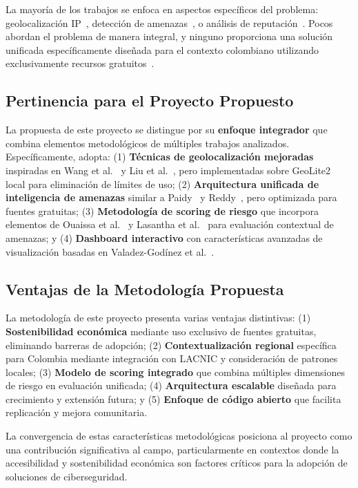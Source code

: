 La mayoría de los trabajos se enfoca en aspectos específicos del problema: geolocalización IP~\cite{6,7,8}, detección de amenazas~\cite{9,12}, o análisis de reputación~\cite{11}. Pocos abordan el problema de manera integral, y ninguno proporciona una solución unificada específicamente diseñada para el contexto colombiano utilizando exclusivamente recursos gratuitos~\cite{13}.

\subsection{Pertinencia para el Proyecto Propuesto}

La propuesta de este proyecto se distingue por su \textbf{enfoque integrador} que combina elementos metodológicos de múltiples trabajos analizados. Específicamente, adopta: (1) \textbf{Técnicas de geolocalización mejoradas} inspiradas en Wang et al.~\cite{7} y Liu et al.~\cite{8}, pero implementadas sobre GeoLite2 local para eliminación de límites de uso; (2) \textbf{Arquitectura unificada de inteligencia de amenazas} similar a Paidy~\cite{9} y Reddy~\cite{14}, pero optimizada para fuentes gratuitas; (3) \textbf{Metodología de scoring de riesgo} que incorpora elementos de Ouaissa et al.~\cite{10} y Lasantha et al.~\cite{11} para evaluación contextual de amenazas; y (4) \textbf{Dashboard interactivo} con características avanzadas de visualización basadas en Valadez-Godínez et al.~\cite{15}.

\subsection{Ventajas de la Metodología Propuesta}

La metodología de este proyecto presenta varias ventajas distintivas: (1) \textbf{Sostenibilidad económica} mediante uso exclusivo de fuentes gratuitas, eliminando barreras de adopción; (2) \textbf{Contextualización regional} específica para Colombia mediante integración con LACNIC y consideración de patrones locales; (3) \textbf{Modelo de scoring integrado} que combina múltiples dimensiones de riesgo en evaluación unificada; (4) \textbf{Arquitectura escalable} diseñada para crecimiento y extensión futura; y (5) \textbf{Enfoque de código abierto} que facilita replicación y mejora comunitaria.

La convergencia de estas características metodológicas posiciona al proyecto como una contribución significativa al campo, particularmente en contextos donde la accesibilidad y sostenibilidad económica son factores críticos para la adopción de soluciones de ciberseguridad.
